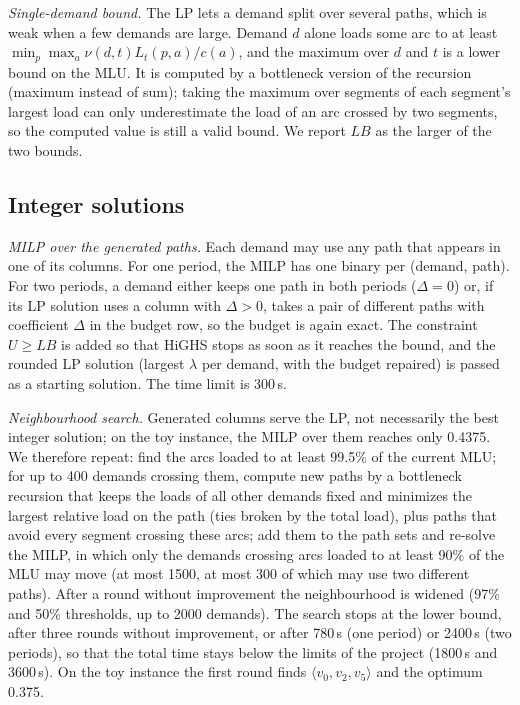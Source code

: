 \documentclass[conference]{IEEEtran}
\begin{document}
\emph{Single-demand bound.} The LP lets a demand split over several paths, which is weak when a few demands are large. Demand $d$ alone loads some arc to at least $\min_p\max_a\nu(d,t)L_t(p,a)/c(a)$, and the maximum over $d$ and $t$ is a lower bound on the MLU. It is computed by a bottleneck version of the recursion (maximum instead of sum); taking the maximum over segments of each segment's largest load can only underestimate the load of an arc crossed by two segments, so the computed value is still a valid bound. We report $LB$ as the larger of the two bounds.

\subsection{Integer solutions}
\emph{MILP over the generated paths.} Each demand may use any path that appears in one of its columns. For one period, the MILP has one binary per (demand, path). For two periods, a demand either keeps one path in both periods ($\Delta=0$) or, if its LP solution uses a column with $\Delta>0$, takes a pair of different paths with coefficient $\Delta$ in the budget row, so the budget is again exact. The constraint $U\ge LB$ is added so that HiGHS stops as soon as it reaches the bound, and the rounded LP solution (largest $\lambda$ per demand, with the budget repaired) is passed as a starting solution. The time limit is 300\,s.

\emph{Neighbourhood search.} Generated columns serve the LP, not necessarily the best integer solution; on the toy instance, the MILP over them reaches only 0.4375. We therefore repeat: find the arcs loaded to at least 99.5\% of the current MLU; for up to 400 demands crossing them, compute new paths by a bottleneck recursion that keeps the loads of all other demands fixed and minimizes the largest relative load on the path (ties broken by the total load), plus paths that avoid every segment crossing these arcs; add them to the path sets and re-solve the MILP, in which only the demands crossing arcs loaded to at least 90\% of the MLU may move (at most 1500, at most 300 of which may use two different paths). After a round without improvement the neighbourhood is widened (97\% and 50\% thresholds, up to 2000 demands). The search stops at the lower bound, after three rounds without improvement, or after 780\,s (one period) or 2400\,s (two periods), so that the total time stays below the limits of the project (1800\,s and 3600\,s). On the toy instance the first round finds $\langle v_0,v_2,v_5\rangle$ and the optimum 0.375.
\end{document}
